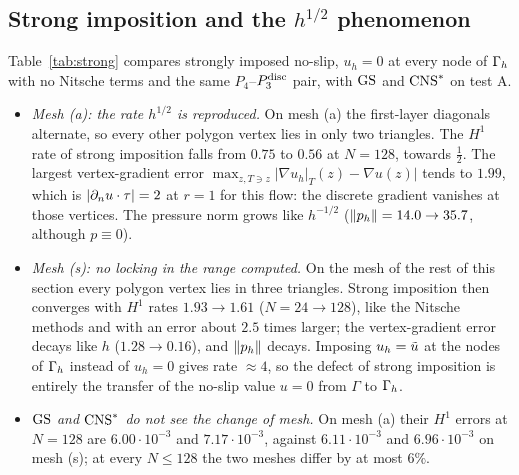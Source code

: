 \subsection{Strong imposition and the \texorpdfstring{$h^{1/2}$}{h^(1/2)} phenomenon}\label{num:strong}
Table~\ref{tab:strong} compares strongly imposed no-slip, $u_h=0$ at every node of $\Gamma_h$ with no Nitsche terms and the same $P_4$--$P_3^{\rm disc}$ pair, with $\mathrm{GS}$ and $\mathrm{CNS}^\ast$ on test A.
\begin{itemize}
\item \emph{Mesh (a): the rate $h^{1/2}$ is reproduced.} On mesh (a) the first-layer diagonals alternate, so every other polygon vertex lies in only two triangles. The $H^1$ rate of strong imposition falls from $0.75$ to $0.56$ at $N=128$, towards $\frac12$. The largest vertex-gradient error $\max_{z,T\ni z}|\nabla u_h|_T(z)-\nabla u(z)|$ tends to $1.99$, which is $|\partial_n u\cdot\tau|=2$ at $r=1$ for this flow: the discrete gradient vanishes at those vertices. The pressure norm grows like $h^{-1/2}$ ($\lVert p_h\rVert=14.0\to35.7$, although $p\equiv0$).
\item \emph{Mesh (s): no locking in the range computed.} On the mesh of the rest of this section every polygon vertex lies in three triangles. Strong imposition then converges with $H^1$ rates $1.93\to1.61$ ($N=24\to128$), like the Nitsche methods and with an error about $2.5$ times larger; the vertex-gradient error decays like $h$ ($1.28\to0.16$), and $\lVert p_h\rVert$ decays. Imposing $u_h=\tilde u$ at the nodes of $\Gamma_h$ instead of $u_h=0$ gives rate $\approx4$, so the defect of strong imposition is entirely the transfer of the no-slip value $u=0$ from $\Gamma$ to $\Gamma_h$.
\item \emph{$\mathrm{GS}$ and $\mathrm{CNS}^\ast$ do not see the change of mesh.} On mesh (a) their $H^1$ errors at $N=128$ are $6.00\cdot10^{-3}$ and $7.17\cdot10^{-3}$, against $6.11\cdot10^{-3}$ and $6.96\cdot10^{-3}$ on mesh (s); at every $N\le128$ the two meshes differ by at most $6\%$.
\end{itemize}
